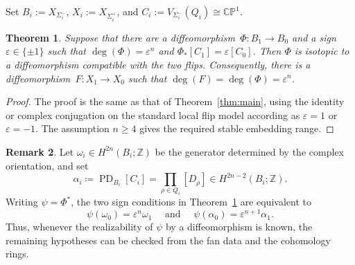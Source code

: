\documentclass{amsart}
\newtheorem{theorem}{Theorem}[section]
\numberwithin{equation}{section}
\theoremstyle{definition}
\newtheorem{remark}[theorem]{Remark}
\newcommand{\Z}{\mathbb Z}
\newcommand{\CP}{\mathbb{CP}}
\newcommand{\wideand}{ \quad \text{ and } \quad }
\DeclareMathOperator{\PD}{PD}
\begin{document}
Set $B_i:=X_{\Sigma_i^-}$, $X_i:=X_{\Sigma_i^+}$, and $C_i:=V_{\Sigma_i^-}(Q_i)\cong\CP^1$.

\begin{theorem}\label{thm:criterion_flip}
    Suppose that there are a diffeomorphism~$\Phi\colon B_1\to B_0$ and a sign~$\varepsilon\in\{\pm1\}$ such that $\deg(\Phi)=\varepsilon^n$ and $\Phi_*[C_1]=\varepsilon[C_0]$.
    Then $\Phi$ is isotopic to a diffeomorphism compatible with the two flips. 
    Consequently, there is a diffeomorphism~$F\colon X_1\to X_0$ such that $\deg(F)=\deg(\Phi)=\varepsilon^n$.
\end{theorem}
\begin{proof}
    The proof is the same as that of Theorem~\ref{thm:main}, using the identity or complex conjugation on the standard local flip model according as $\varepsilon=1$ or $\varepsilon=-1$. 
    The assumption $n\ge 4$ gives the required stable embedding range.
\end{proof}

\begin{remark}
    Let $\omega_i\in H^{2n}(B_i;\Z)$ be the generator determined by the complex orientation, and set
    $$
        \alpha_i \coloneq \PD_{B_i}[C_i] = \prod_{\rho\in Q_i}[D_\rho] \in H^{2n-2}(B_i;\Z).
    $$
    Writing $\psi=\Phi^*$, the two sign conditions in Theorem~\ref{thm:criterion_flip} are equivalent to
    $$
        \psi(\omega_0)=\varepsilon^n\omega_1 \wideand \psi(\alpha_0)=\varepsilon^{n+1}\alpha_1.
    $$
    Thus, whenever the realizability of $\psi$ by a diffeomorphism is known, the remaining hypotheses can be checked from the fan data and the cohomology rings.
\end{remark}
\end{document}
